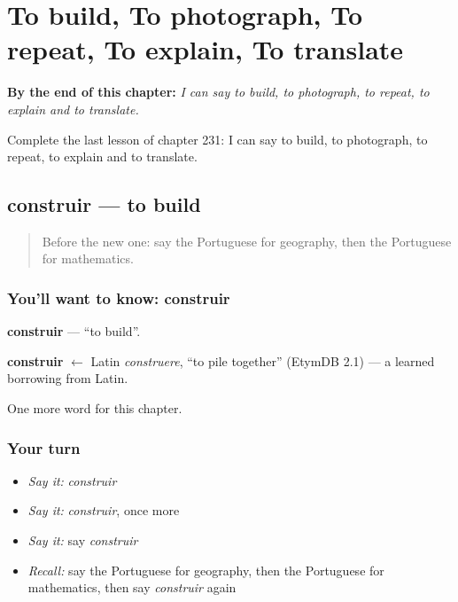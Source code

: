 
\chapter{To build, To photograph, To repeat, To explain, To translate}
\label{ch:pt-to-build-to-photograph-to-repeat-to-explain-to-translate}

\begin{chapteropening}
\textbf{By the end of this chapter:} \emph{I can say to build, to photograph, to repeat, to explain and to translate.}

Complete the last lesson of chapter 231: I can say to build, to photograph, to repeat, to explain and to translate.
\end{chapteropening}

\section[construir]{construir — to build}

\label{lesson:PT-C231-construir}



\begin{quote}
Before the new one: say the Portuguese for geography, then the Portuguese for mathematics.
\end{quote}

\subsection*{You'll want to know: construir}
\textbf{construir} — \textquotedblleft{}to build\textquotedblright{}.

\begin{cousinweb}
\textbf{construir} $\leftarrow$ Latin \emph{construere}, \textquotedblleft{}to pile together\textquotedblright{} (EtymDB 2.1) — a learned borrowing from Latin.
\end{cousinweb}

\begin{grammarlens}[title={What you've built}]
One more word for this chapter.
\end{grammarlens}

\subsection*{Your turn}
\begin{itemize}
\raggedright
  \item \emph{Say it:} \emph{construir}
  \item \emph{Say it:} \emph{construir}, once more
  \item \emph{Say it:} say \emph{construir}
  \item \emph{Recall:} say the Portuguese for geography, then the Portuguese for mathematics, then say \emph{construir} again
\end{itemize}

